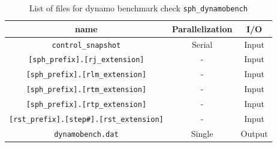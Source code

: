 \begin{table}[htp]
\caption{List of files for dynamo benchmark check {\tt sph\_dynamobench} }
\begin{center} 
\begin{tabular}{|c|c|c|}
\hline
 name & Parallelization & I/O \\ \hline \hline
\verb|control_snapshot| & Serial & Input \\ \hline
\verb|[sph_prefix].[rj_extension]|  & - & Input \\
\verb|[sph_prefix].[rlm_extension]| & - & Input \\
\verb|[sph_prefix].[rtm_extension]| & - & Input \\
\verb|[sph_prefix].[rtp_extension]| & - & Input \\ \hline
\verb|[rst_prefix].[step#].[rst_extension]| &  - & Input  \\ \hline
\verb|dynamobench.dat| & Single & Output \\ \hline
\end{tabular}
\end{center}
\label{table:sph_dynamobench}
\end{table}

